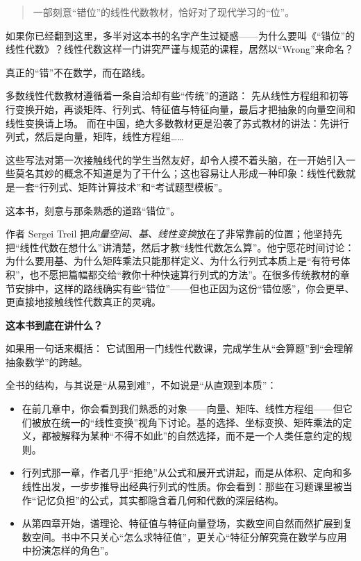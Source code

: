 
\begin{preface}[推荐序]

\begin{quotation}
一部刻意“错位”的线性代数教材，恰好对了现代学习的“位”。
\end{quotation}
如果你已经翻到这里，多半对这本书的名字产生过疑惑——为什么要叫《“错位”的线性代数》？线性代数这样一门讲究严谨与规范的课程，居然以“Wrong”来命名？

真正的“错”不在数学，而在路线。

多数线性代数教材遵循着一条自洽却有些“传统”的道路：
先从线性方程组和初等行变换开始，再谈矩阵、行列式、特征值与特征向量，最后才把抽象的向量空间和线性变换请上场。
而在中国，绝大多数教材更是沿袭了苏式教材的讲法：先讲行列式，然后是向量，矩阵，线性方程组……

这些写法对第一次接触线代的学生当然友好，却令人摸不着头脑，在一开始引入一些莫名其妙的概念不知道是为了干什么；这也容易让人形成一种印象：线性代数就是一套“行列式、矩阵计算技术”和“考试题型模板”。

这本书，刻意与那条熟悉的道路“错位”。

作者 Sergei Treil 把\emph{向量空间、基、线性变换}放在了非常靠前的位置；他坚持先把“线性代数在想什么”讲清楚，然后才教“线性代数怎么算”。他宁愿花时间讨论：为什么要用基、为什么矩阵乘法只能那样定义、为什么行列式本质上是“有符号体积”，也不愿把篇幅都交给“教你十种快速算行列式的方法”。在很多传统教材的章节安排中，这样的路线确实有些“错位”——但也正因为这份“错位感”，你会更早、更直接地接触线性代数真正的灵魂。

\textbf{这本书到底在讲什么？}

如果用一句话来概括：
它试图用一门线性代数课，完成学生从“会算题”到“会理解抽象数学”的跨越。

全书的结构，与其说是“从易到难”，不如说是“从直观到本质”：

\begin{itemize}
  \item 在前几章中，你会看到我们熟悉的对象——向量、矩阵、线性方程组——但它们被放在统一的“线性变换”视角下讨论。基的选择、坐标变换、矩阵乘法的定义，都被解释为某种“不得不如此”的自然选择，而不是一个人类任意约定的规则。

  \item 行列式那一章，作者几乎“拒绝”从公式和展开式讲起，而是从体积、定向和多线性出发，一步步推导出经典行列式的性质。你会看到：那些在习题课里被当作“记忆负担”的公式，其实都隐含着几何和代数的深层结构。

  \item 从第四章开始，谱理论、特征值与特征向量登场，实数空间自然而然扩展到复数空间。书中不只关心“怎么求特征值”，更关心“特征分解究竟在数学与应用中扮演怎样的角色”。


\end{itemize}
\end{preface}
